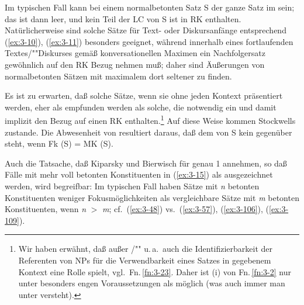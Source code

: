 \documentclass[output=paper]{langsci/langscibook}
\begin{document}
Im typischen Fall kann bei einem normalbetonten Satz S der ganze
Satz im  sein; das  ist dann leer, und kein Teil der LC von
S ist in RK enthalten. Natürlicherweise sind solche Sätze für
Text- oder Diskursanfänge entsprechend (\ref{ex:3-10}), (\ref{ex:3-11}) besonders geeignet,
während innerhalb eines fortlaufenden Textes/""Diskurses gemäß
konversationellen Maximen ein Nachfolgersatz gewöhnlich auf den RK
Bezug nehmen muß; daher sind Äußerungen von normalbetonten Sätzen mit
maximalem  dort seltener zu finden.

Es ist zu erwarten, daß solche Sätze, wenn sie ohne jeden Kontext
präsentiert werden, eher als  empfunden werden als
solche, die notwendig ein  und damit implizit den Bezug auf einen
RK enthalten.\footnote{\label{fn:3-25}%
	Wir haben erwähnt, daß außer /"" u.\,a.\ auch die
  Identifizierbarkeit der Referenten von NPs für die Verwendbarkeit
  eines Satzes in gegebenem Kontext eine Rolle spielt,
  vgl.\ Fn.\,\ref{fn:3-23}. Daher ist \zb (i) von Fn.\,\ref{fn:3-2} nur unter besonders engen
  Voraussetzungen als  möglich (was auch immer man
  unter  versteht).%
}
Auf diese Weise kommen Stockwells  zustande. Die Abwesenheit von  resultiert daraus, daß dem 
von S kein  gegenüber steht, wenn Fk (S) = MK (S).

Auch die Tatsache, daß Kiparsky und Bierwisch für
 genau 1  annehmen, so daß Fälle mit
mehr voll betonten Konstituenten in (\ref{ex:3-15}) als 
ausgezeichnet werden, wird begreifbar: Im typischen Fall haben Sätze
mit \textit{n} betonten Konstituenten weniger Fokusmöglichkeiten als
vergleichbare Sätze mit \textit{m} betonten Konstituenten, wenn \textit{n} $>$ \textit{m};
cf.\ \zb (\ref{ex:3-48}) vs.\ (\ref{ex:3-57}), (\ref{ex:3-106}), (\ref{ex:3-109}).
\end{document}
